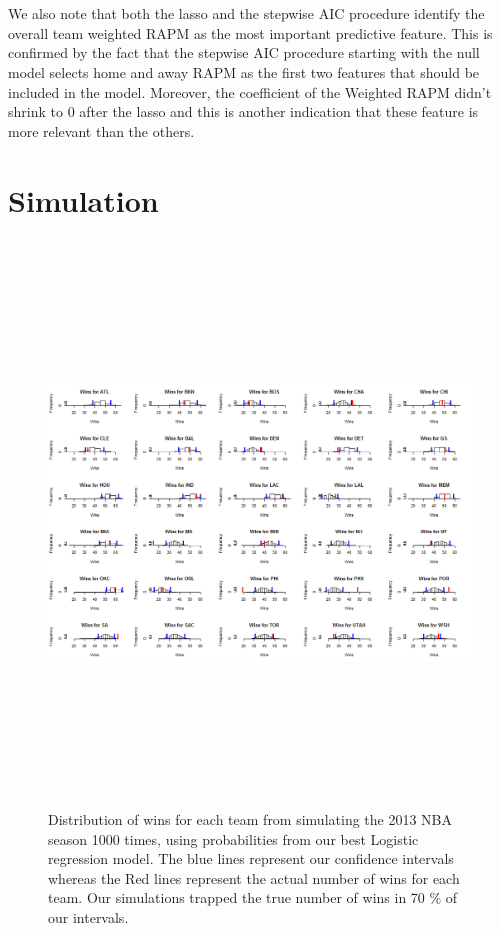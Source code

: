 \documentclass{article} %
\begin{document}
\\ \\	We also note that both the lasso and the stepwise AIC procedure identify the overall team weighted RAPM as the most important predictive feature. This is confirmed by the fact that the stepwise AIC procedure starting with the null model selects home and away RAPM as the first two features that should be included in the model. Moreover, the coefficient of the  Weighted RAPM didn't shrink to 0 after the lasso and this is another indication that these feature is more relevant than the others.	
\section{Simulation}	

\begin{figure}
  \centering
  \includegraphics[height=15cm, width=15cm]{season_wins.png}
  \caption{Distribution of wins for each team from simulating the 2013 NBA season 1000 times, using probabilities from our best Logistic regression model. The blue lines represent our confidence intervals whereas the Red lines represent the actual number of wins for each team. Our simulations trapped the true number of wins in 70 \% of our intervals.}
  \label{fig:simulations}
\end{figure}
\end{document}
